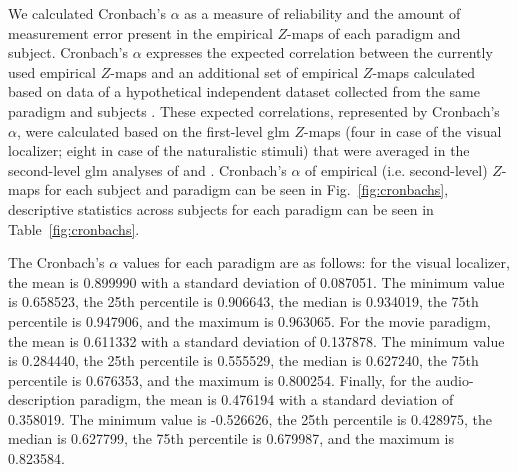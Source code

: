 %
We calculated Cronbach's $\alpha$ as a measure of reliability and the amount of
measurement error \citep{cronbach1951coefficient, cortina1993coefficient}
present in the empirical $Z$-maps of each paradigm and subject.
%
Cronbach's $\alpha$ expresses the expected correlation between the currently
used empirical $Z$-maps and an additional set of empirical $Z$-maps calculated
based on data of a hypothetical independent dataset collected from the same
paradigm and subjects \citep{jiahui2020predicting, jiahui2022cross}.
%
These expected correlations, represented by Cronbach's $\alpha$, were calculated
based on the first-level \ac{glm} $Z$-maps (four in case of the visual
localizer; eight in case of the naturalistic stimuli) that were averaged in the
second-level \ac{glm} analyses of \citet{sengupta2016extension} and
\citet{haeusler2022processing}.
%
Cronbach's $\alpha$ of empirical (i.e. second-level) $Z$-maps for each subject
and paradigm can be seen in Fig.~\ref{fig:cronbachs}, descriptive statistics
across subjects for each paradigm can be seen in Table~\ref{fig:cronbachs}.


%
%



The Cronbach's $\alpha$ values for each paradigm are as follows:
%
for the visual localizer,
%
the mean is 0.899990 with a standard deviation of 0.087051.
%
The minimum value is 0.658523, the 25th percentile is 0.906643, the median is
0.934019, the 75th percentile is 0.947906, and the maximum is 0.963065.
%
For the movie paradigm,
%
the mean is 0.611332 with a standard deviation of 0.137878.
%
The minimum value is 0.284440, the 25th percentile is 0.555529, the median is
0.627240, the 75th percentile is 0.676353, and the maximum is 0.800254.
%
Finally, for the audio-description paradigm, the mean is 0.476194 with a
standard deviation of 0.358019.
%
The minimum value is -0.526626, the 25th percentile is 0.428975, the median is
0.627799, the 75th percentile is 0.679987, and the maximum is 0.823584.


